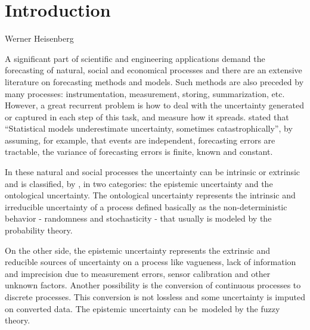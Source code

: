 \chapter[Introduction]{Introduction} 
\label{chap:Intro} 

{Werner Heisenberg}

A significant part of scientific and engineering applications demand the forecasting of natural, social and economical processes and there are an extensive literature on forecasting methods and models. Such methods are also preceded by many  processes: instrumentation, measurement, storing, summarization, etc. However, a great recurrent problem is how to deal with the uncertainty generated or captured in each step of this task, and measure how it spreads. \cite{Makridakis2009} stated that ``Statistical models underestimate uncertainty, sometimes catastrophically'', by assuming, for example, that events are independent, forecasting errors are tractable, the variance of forecasting errors is finite, known and constant. 


In these natural and social processes the uncertainty can be intrinsic or extrinsic and is classified, by \cite{Georgescu2014}, in two categories: the epistemic uncertainty and the ontological uncertainty. The ontological uncertainty represents the intrinsic and irreducible uncertainty of a process defined basically as the non-deterministic behavior - randomness and stochasticity - that usually is modeled by the probability theory. 


On the other side, the epistemic uncertainty represents the extrinsic and reducible sources of uncertainty on a process like vagueness, lack of information and imprecision due to measurement errors, sensor calibration and other unknown factors. Another possibility is the conversion of continuous processes to discrete processes. This conversion is not lossless and some uncertainty is imputed on converted data. The epistemic uncertainty can be modeled by the fuzzy theory. 

